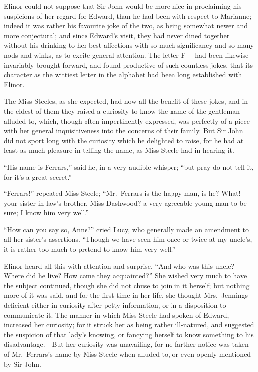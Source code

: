 Elinor could not suppose that Sir John would be more
nice in proclaiming his suspicions of her regard for Edward,
than he had been with respect to Marianne; indeed it was
rather his favourite joke of the two, as being somewhat
newer and more conjectural; and since Edward's visit,
they had never dined together without his drinking to her
best affections with so much significancy and so many nods
and winks, as to excite general attention.  The letter F---
had been likewise invariably brought forward, and found
productive of such countless jokes, that its character
as the wittiest letter in the alphabet had been long
established with Elinor.

The Miss Steeles, as she expected, had now all the
benefit of these jokes, and in the eldest of them they
raised a curiosity to know the name of the gentleman
alluded to, which, though often impertinently expressed,
was perfectly of a piece with her general inquisitiveness
into the concerns of their family.  But Sir John did not
sport long with the curiosity which he delighted to raise,
for he had at least as much pleasure in telling the name,
as Miss Steele had in hearing it.

``His name is Ferrars,'' said he, in a very audible whisper;
``but pray do not tell it, for it's a great secret.''

``Ferrars!'' repeated Miss Steele; ``Mr.\ Ferrars is
the happy man, is he? What! your sister-in-law's brother,
Miss Dashwood? a very agreeable young man to be sure;
I know him very well.''

``How can you say so, Anne?'' cried Lucy, who generally
made an amendment to all her sister's assertions.
``Though we have seen him once or twice at my uncle's, it
is rather too much to pretend to know him very well.''

Elinor heard all this with attention and surprise.
``And who was this uncle?  Where did he live?  How came
they acquainted?''  She wished very much to have the subject
continued, though she did not chuse to join in it herself;
but nothing more of it was said, and for the first time
in her life, she thought Mrs.\ Jennings deficient either
in curiosity after petty information, or in a disposition
to communicate it.  The manner in which Miss Steele had
spoken of Edward, increased her curiosity; for it struck
her as being rather ill-natured, and suggested the suspicion
of that lady's knowing, or fancying herself to know something
to his disadvantage.---But her curiosity was unavailing,
for no farther notice was taken of Mr.\ Ferrars's name by
Miss Steele when alluded to, or even openly mentioned by Sir
John.



